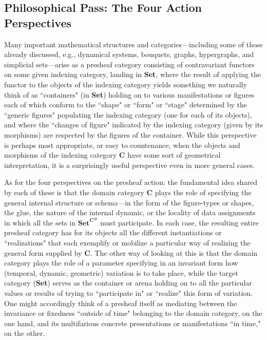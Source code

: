 \documentclass[a4paper]{book}
\theoremstyle{definition}
\theoremstyle{definition}
\theoremstyle{definition}
\theoremstyle{theorem}
\theoremstyle{definition}
\begin{document}
\subsection{Philosophical Pass: The Four Action Perspectives}
Many important mathematical structures and categories---including some of those already discussed, e.g., dynamical systems, bouquets, graphs, hypergraphs, and simplicial sets---arise as a presheaf category consisting of contravariant functors on some given indexing category, landing in \textbf{Set}, where the result of applying the functor to the objects of the indexing category yields something we naturally think of as ``containers" (in \textbf{Set}) holding on to various manifestations or figures each of which conform to the ``shape" or ``form" or ``stage" determined by the ``generic figures" populating the indexing category (one for each of its objects), and where the ``changes of figure" indicated by the indexing category (given by its morphisms) are respected by the figures of the container. While this perspective is perhaps most appropriate, or easy to countenance, when the objects and morphisms of the indexing category $\textbf{C}$ have some sort of geometrical interpretation, it is a surprisingly useful perspective even in more general cases. \par
As for the four perspectives on the presheaf action: the fundamental idea shared by each of these is that the domain category \textbf{C} plays the role of specifying the general internal structure or schema---in the form of the figure-types or shapes, the glue, the nature of the internal dynamic, or the locality of data assignments in which all the sets in $\textbf{Set}^{\textbf{C}^{op}}$ must participate. In each case, the resulting entire presheaf category has for its objects all the different instantiations or ``realizations" that each exemplify or mobilize a particular way of realizing the general form supplied by \textbf{C}. The other way of looking at this is that the domain category plays the role of a parameter specifying in an invariant form how (temporal, dynamic, geometric) variation is to take place, while the target category (\textbf{Set}) serves as the container or arena holding on to all the particular values or results of trying to ``participate in" or ``realize" this form of variation. One might accordingly think of a presheaf itself as mediating between the invariance or fixedness ``outside of time" belonging to the domain category, on the one hand, and its multifarious concrete presentations or manifestations ``in time," on the other.  \par   
\end{document}
